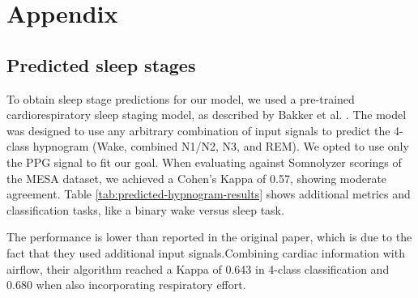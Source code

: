 \chapter{Appendix \label{Chapter-Appendix}}

\section{Predicted sleep stages \label{Apx-Pred-Hypnogram}}

To obtain sleep stage predictions for our model, we used a pre-trained cardiorespiratory sleep staging model, as described by Bakker et al. \cite{bakker2021estimating}. The model was designed to use any arbitrary combination of input signals to predict the 4-class hypnogram (Wake, combined N1/N2, N3, and REM). We opted to use only the PPG signal to fit our goal. When evaluating against Somnolyzer scorings of the MESA dataset, we achieved a Cohen's Kappa of 0.57, showing moderate agreement. Table \ref{tab:predicted-hypnogram-results} shows additional metrics and classification tasks, like a binary wake versus sleep task.

The performance is lower than reported in the original paper, which is due to the fact that they used additional input signals.Combining cardiac information with airflow, their algorithm reached a Kappa of 0.643 in 4-class classification and 0.680 when also incorporating respiratory effort.

